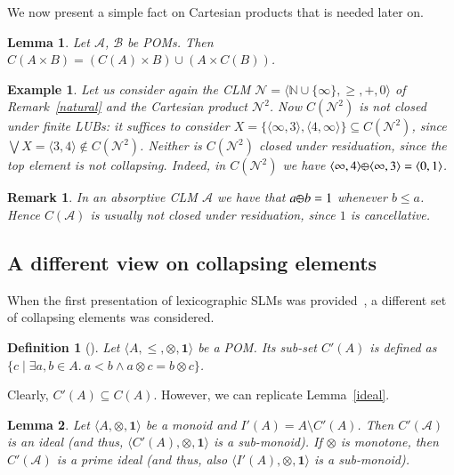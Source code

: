 \documentclass[a4paper]{elsarticle}
\newtheorem{definition}{Definition}
\newtheorem{example}{Example}
\newtheorem{remark}{Remark}
\newtheorem{lemma}{Lemma}
\newcommand{\monop}{\otimes}
\newcommand{\1}{\mathbf{1}}
\def\odiv{{ \ominus\hspace{-8pt}:}\;}
\begin{document}
We now present a simple fact on Cartesian products  that is needed later on.

\begin{lemma}
	Let $\mathcal{A}$, $\mathcal{B}$ be POMs.
	Then $C(A \times B) = (C(A) \times B) \cup (A \times C(B))$. 
\end{lemma}

\begin{example}
	Let us consider again the CLM $\mathcal{N} = \langle \mathbb N \cup \{\infty\}, \geq, +, 0 \rangle$ 
	of Remark~\ref{natural} and the Cartesian product $\mathcal{N}^2$. 
	Now $C(\mathcal{N}^2)$ is not closed under finite LUBs: it suffices to consider 
	$X= \{\langle \infty, 3 \rangle, \langle 4, \infty \rangle\} \subseteq C(\mathcal{N}^2)$,
	since $\bigvee X  = \langle 3,4 \rangle \not \in C(\mathcal{N}^2)$.
	Neither is $C(\mathcal{N}^2)$ closed under residuation, 
	since the top element is not collapsing.
	Indeed, in $C(\mathcal{N}^2)$ we have 
	$\langle \infty, 4 \rangle  \odiv \langle \infty, 3 \rangle = \langle 0,1\rangle$.
\end{example}

\begin{remark}
	In an absorptive CLM $\mathcal{A}$ we have that $a \odiv b = 1$ 
	whenever $b \leq a$. Hence $C(\mathcal{A})$ is usually not closed under residuation, since 
	$1$ is cancellative.
\end{remark}

\subsection{A different view on collapsing elements}

When the first presentation of lexicographic 
SLMs was provided~\cite{GadducciHMW13}, a different 
set of collapsing elements was considered.

\begin{definition}[\cite{GadducciHMW13}]
	Let $\langle A, \leq, \monop, \1 \rangle$ be a POM. Its sub-set $C'(A)$ 
	is defined as 
	$\{ c \mid \exists a, b \in A.\ a < b \wedge a \otimes c = b \otimes c\}$.
\end{definition}

Clearly, $C'(A) \subseteq C(A)$. However, we can replicate Lemma~\ref{ideal}.
%

\begin{lemma}\label{lemma:six}
	Let $\langle A, \monop, \1 \rangle$ be a monoid
	and $I'(A) = A \setminus C'(A)$.
	Then $C'(\mathcal{A})$ is an ideal 
	(and thus, $\langle C'(A), \monop, \1 \rangle$ is a sub-monoid).
	If $\monop$ is monotone, then 
	$C'(\mathcal{A})$ is a prime ideal
	(and thus, also $\langle I'(A), \monop, \1 \rangle$ is a sub-monoid).
\end{lemma}
\end{document}
